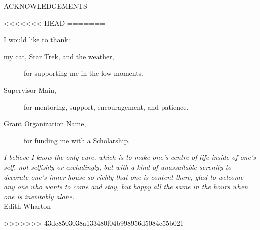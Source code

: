 \newpage
{}

\begin{center}
ACKNOWLEDGEMENTS
\end{center}
<<<<<<< HEAD
%
%
=======

\noindent I would like to thank:
\begin{description}
\item[my cat, Star Trek, and the weather,]
	for supporting me in the low moments.
\item[Supervisor Main,]
	for  mentoring, support, encouragement, and patience.
\item[Grant Organization Name,]
	for funding me with a Scholarship.
\end{description}

\begin{flushright}
\textit{I believe I know the only cure, which is to make
one's centre of life inside of one's self, not
selfishly or excludingly, but with a kind of
unassailable serenity-to decorate one's inner house
so richly that one is content there, glad to welcome
any one who wants to come and stay, but happy all
the same in the hours when one is inevitably alone.}
\\
Edith Wharton \\
\end{flushright}
>>>>>>> 43dc8503038a133480f04b998956d5084c55b021
